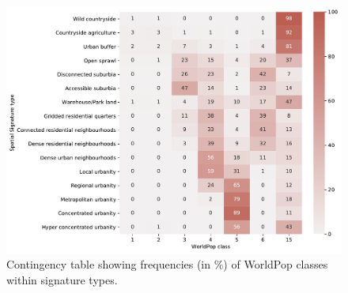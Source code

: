 \begin{figure}
    \centering
    \includegraphics[width=.8\linewidth]{fig/crosstab_worldpop.pdf}
    \caption{Contingency table showing frequencies (in \%) of WorldPop classes within signature types.}
    \label{fig:crosstab_worldpop}
\end{figure}

